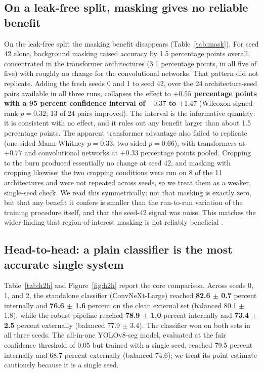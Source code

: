 \documentclass{elektr}
\begin{document}
\subsection{On a leak-free split, masking gives no reliable benefit}
\label{Res:mask}
On the leak-free split the masking benefit disappears (Table~\ref{tab:mask}). For seed 42 alone, background masking raised accuracy by 1.5 percentage points overall, concentrated in the transformer architectures (3.1 percentage points, in all five of five) with roughly no change for the convolutional networks. That pattern did not replicate. Adding the fresh seeds 0 and 1 to seed 42, over the 24 architecture-seed pairs available in all three runs, collapses the effect to \textbf{$+0.55$ percentage points with a 95 percent confidence interval of $-0.37$ to $+1.47$} (Wilcoxon signed-rank $p=0.32$; 13 of 24 pairs improved). The interval is the informative quantity: it is consistent with no effect, and it rules out any benefit larger than about 1.5 percentage points. The apparent transformer advantage also failed to replicate (one-sided Mann-Whitney $p=0.33$; two-sided $p=0.66$), with transformers at $+0.77$ and convolutional networks at $+0.33$ percentage points pooled. Cropping to the burn produced essentially no change at seed 42, and masking with cropping likewise; the two cropping conditions were run on 8 of the 11 architectures and were not repeated across seeds, so we treat them as a weaker, single-seed check. We read this symmetrically: not that masking is exactly zero, but that any benefit it confers is smaller than the run-to-run variation of the training procedure itself, and that the seed-42 signal was noise. This matches the wider finding that region-of-interest masking is not reliably beneficial \cite{sourget}.


\subsection{Head-to-head: a plain classifier is the most accurate single system}
\label{Res:h2h}
Table~\ref{tab:h2h} and Figure~\ref{fig:h2h} report the core comparison. Across seeds 0, 1, and 2, the standalone classifier (ConvNeXt-Large) reached \textbf{82.6 $\pm$ 0.7} percent internally and \textbf{76.6 $\pm$ 1.6} percent on the clean external set (balanced 80.1 $\pm$ 1.8), while the robust pipeline reached \textbf{78.9 $\pm$ 1.0} percent internally and \textbf{73.4 $\pm$ 2.5} percent externally (balanced 77.9 $\pm$ 3.4). The classifier won on both sets in all three seeds. The all-in-one YOLOv8-seg model, evaluated at the fair confidence threshold of 0.05 but trained with a single seed, reached 79.5 percent internally and 68.7 percent externally (balanced 74.6); we treat its point estimate cautiously because it is a single seed.
\end{document}
